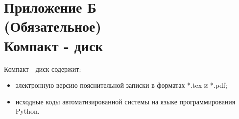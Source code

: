

\section*{Приложение Б\\(Обязательное)\\Компакт - диск}
Компакт - диск содержит: 
\begin{itemize}
\item электронную версию пояснительной записки в форматах *.tex и *.pdf;
\item исходные коды автоматизированной системы на языке программирования Python.
\end{itemize}
 
